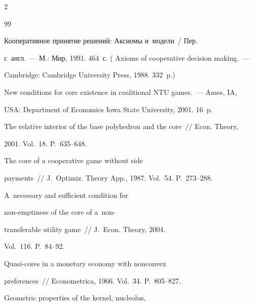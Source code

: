 \begin{multicols}{2}
{{\begin{thebibliography}{99}
 


       Кооперативное принятие решений: Аксиомы и~модели~/ Пер. 

 с~англ.~--- М.: Мир, 1991. 464~с. ( Axioms of cooperative decision making.~--- 

Cambridge: Cambridge University Press, 1988. 332~p.)


       New conditions for core existence in coalitional NTU games.~--- Ames, IA, 

USA: Department of Economics Iowa State University, 2001. 16~p.


       The relative interior of the base polyhedron and the core~// Econ. Theory, 

2001. Vol.~18. P.~635--648.


       The core of a cooperative game without side 

payments~// J.~Optimiz. Theory App., 1987. Vol.~54. P.~273--288.








       A~necessary and sufficient condition for  

non-emptiness of the core of a~non-\linebreak\vspace*{-12pt}



\pagebreak



\noindent

transferable utility game~// J.~Econ. Theory, 2004. 

Vol.~116. P.~84--92.


       Quasi-cores in a monetary economy with nonconvex 

preferences~// Econometrica, 1966. Vol.~34. P.~805--827.


       Geometric properties of the kernel, nucleolus, 


\end{thebibliography}}}
\end{multicols}
